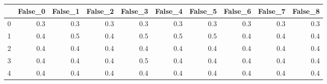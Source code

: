 \begin{tabular}{lrrrrrrrrr}
\toprule
{} &  False\_0 &  False\_1 &  False\_2 &  False\_3 &  False\_4 &  False\_5 &  False\_6 &  False\_7 &  False\_8 \\ \hline
\midrule
0 &      0.3 &      0.3 &      0.3 &      0.3 &      0.3 &      0.3 &      0.3 &      0.3 &      0.3 \\ \hline
1 &      0.4 &      0.5 &      0.4 &      0.5 &      0.5 &      0.5 &      0.4 &      0.4 &      0.4 \\ \hline
2 &      0.4 &      0.4 &      0.4 &      0.4 &      0.4 &      0.4 &      0.4 &      0.4 &      0.4 \\ \hline
3 &      0.4 &      0.4 &      0.4 &      0.5 &      0.4 &      0.4 &      0.4 &      0.4 &      0.4 \\ \hline
4 &      0.4 &      0.4 &      0.4 &      0.4 &      0.4 &      0.4 &      0.4 &      0.4 &      0.4 \\ \hline
\bottomrule
\end{tabular}
